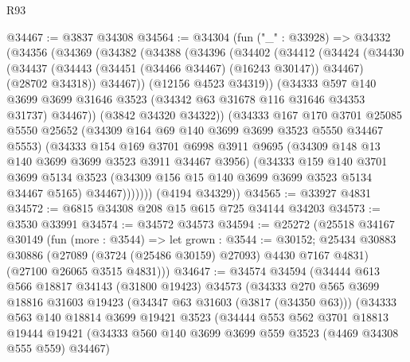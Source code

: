 \begin{lexlean}{R93}
\begin{coremodule}
@34467 := @3837 @34308
@34564 := @34304
    (fun ("_" : @33928) =>
    @34332
      (@34356
        (@34369
          (@34382
            (@34388
              (@34396
                (@34402
                  (@34412
                    (@34424
                      (@34430
                        (@34437
                          (@34443 (@34451 (@34466 @34467) (@16243 @30147)) @34467)
                          (@28702 @34318))
                        @34467))
                    (@12156 @4523 @34319))
                  (@34333
                    @597
                    @140
                    @3699
                    @3699
                    @31646
                    @3523
                    (@34342 @63 @31678 @116 @31646 @34353 @31737)
                    @34467))
                (@3842 @34320 @34322))
              (@34333
                @167
                @170
                @3701
                @25085
                @5550
                @25652
                (@34309 @164 @69 @140 @3699 @3699 @3523 @5550 @34467 @5553)
                (@34333
                  @154
                  @169
                  @3701
                  @6998
                  @3911
                  @9695
                  (@34309 @148 @13 @140 @3699 @3699 @3523 @3911 @34467 @3956)
                  (@34333
                    @159
                    @140
                    @3701
                    @3699
                    @5134
                    @3523
                    (@34309 @156 @15 @140 @3699 @3699 @3523 @5134 @34467 @5165)
                    @34467)))))))
      (@4194 @34329))
@34565 := @33927 @4831
@34572 := @6815 @34308 @208 @15 @615 @725 @34144 @34203
@34573 := @3530 @33991
@34574 := @34572 @34573
@34594 := @25272
    (@25518
      @34167
      @30149
      (fun (more : @3544) =>
      let grown : @3544 := @30152;
      @25434
        @30883
        @30886
        (@27089 (@3724 (@25486 @30159) @27093) @4430 @7167 @4831)
        (@27100 @26065 @3515 @4831)))
@34647 := @34574
    @34594
    (@34444
      @613
      @566
      @18817
      @34143
      (@31800 @19423)
      @34573
      (@34333
        @270
        @565
        @3699
        @18816
        @31603
        @19423
        (@34347 @63 @31603 (@3817 (@34350 @63)))
        (@34333
          @563
          @140
          @18814
          @3699
          @19421
          @3523
          (@34444
            @553
            @562
            @3701
            @18813
            @19444
            @19421
            (@34333 @560 @140 @3699 @3699 @559 @3523 (@4469 @34308 @555 @559) @34467)

\end{coremodule}
\end{lexlean}
